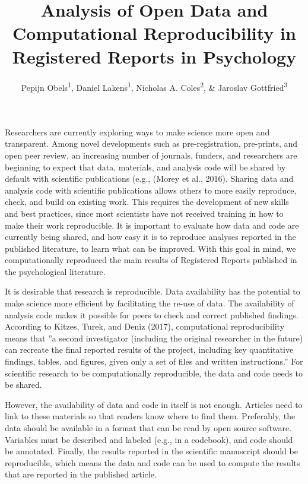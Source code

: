 \documentclass[,jou, a4paper,floatsintext]{apa6}
\title{Analysis of Open Data and Computational Reproducibility in Registered Reports in Psychology}
\author{Pepijn Obels\textsuperscript{1}, Daniel Lakens\textsuperscript{1}, Nicholas A. Coles\textsuperscript{2}, \& Jaroslav Gottfried\textsuperscript{3}}
\date{}
\affiliation{
\vspace{0.5cm}
\textsuperscript{1} Eindhoven University of Technology, The Netherlands\\\textsuperscript{2} University of Tennessee, Knoxville, USA\\\textsuperscript{3} Masaryk University, Brno, Czech Republic}
\begin{document}
\maketitle

Researchers are currently exploring ways to make science more open and transparent. Among novel developments such as pre-registration, pre-prints, and open peer review, an increasing number of journals, funders, and researchers are beginning to expect that data, materials, and analysis code will be shared by default with scientific publications (e.g., (Morey et al., 2016). Sharing data and analysis code with scientific publications allows others to more easily reproduce, check, and build on existing work. This requires the development of new skills and best practices, since most scientists have not received training in how to make their work reproducible. It is important to evaluate how data and code are currently being shared, and how easy it is to reproduce analyses reported in the published literature, to learn what can be improved. With this goal in mind, we computationally reproduced the main results of Registered Reports published in the psychological literature.

It is desirable that research is reproducible. Data availability has the potential to make science more efficient by facilitating the re-use of data. The availability of analysis code makes it possible for peers to check and correct published findings. According to Kitzes, Turek, and Deniz (2017), computational reproducibility means that ''a second investigator (including the original researcher in the future) can recreate the final reported results of the project, including key quantitative findings, tables, and figures, given only a set of files and written instructions.'' For scientific research to be computationally reproducible, the data and code needs to be shared.

However, the availability of data and code in itself is not enough. Articles need to link to these materials so that readers know where to find them. Preferably, the data should be available in a format that can be read by open source software. Variables must be described and labeled (e.g., in a codebook), and code should be annotated. Finally, the results reported in the scientific manuscript should be reproducible, which means the data and code can be used to compute the results that are reported in the published article.
\end{document}

